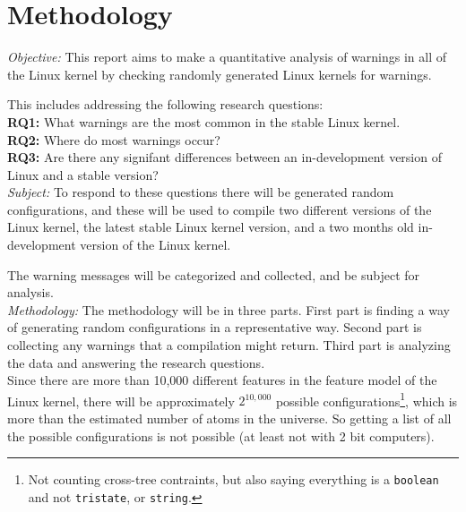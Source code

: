\documentclass[a4paper,11pt]{report}
\newcommand{\f}{\footnote{\fn}}
\begin{document}
\newpage
\chapter{Methodology}

\emph{Objective:}
This report aims to make a quantitative analysis of warnings in all of the
Linux kernel by checking randomly generated Linux kernels for warnings.

This includes addressing the following research questions:
\\

\textbf{RQ1:} What warnings are the most common in the stable Linux kernel.
\\

\textbf{RQ2:} Where do most warnings occur?
\\

\textbf{RQ3:} Are there any signifant differences between an in-development 
version of Linux and a stable version?
\\

\emph{Subject:}
To respond to these questions there will be generated random configurations, 
and these will be used to compile two different versions of the Linux kernel, 
the latest stable Linux kernel version, and a two months old in-development 
version of the Linux kernel.

The warning messages will be categorized and collected, and be subject for 
analysis.
\\

\emph{Methodology:}
The methodology will be in three parts. First part is finding a way of
generating random configurations in a representative way. Second part is 
collecting any warnings that a compilation might return. Third part is 
analyzing the data and answering the research questions.
\\

        \def \fn{Not counting cross-tree contraints, but also saying 
        everything is a \texttt{boolean} and not \texttt{tristate}, or 
        \texttt{string}.}
Since there are more than 10,000 different features in the feature model of the
Linux kernel, there will be approximately $2^{10,000}$ possible 
configurations\f, which is more than the estimated number of atoms in the 
universe. So getting a list of all the possible configurations is not possible 
(at least not with 2 bit computers).
\end{document}

